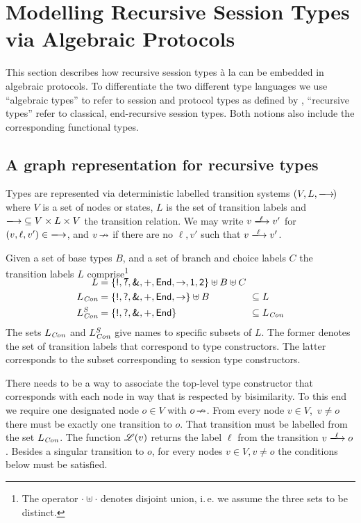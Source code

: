 \section{Modelling Recursive Session Types via Algebraic Protocols}

This section describes how recursive session types \`a la
\citet{DBLP:journals/jfp/GayV10} can be embedded in algebraic protocols. To
differentiate the two different type languages we use ``algebraic types'' to
refer to session and protocol types as defined by
\citet{DBLP:journals/pacmpl/MordidoS0V23}, ``recursive types'' refer to
classical, end-recursive session types. Both notions also include the
corresponding functional types.


\subsection{A graph representation for recursive types}

Types are represented via deterministic labelled transition systems $\stlts$
where $V$ is a set of nodes or states, $L$ is the set of transition labels and
${\sttrans{}} \subseteq V\times L\times V$ the transition relation. We may
write $v\sttrans\ell v'$ for $(v,\ell,v')\in{\sttrans{}}$, and $v\,{\nrightarrow}$ if
there are no $\ell,v'$ such that $v\sttrans\ell v'$.

Given a set of base types $B$, and a set of branch and choice labels $C$ the
transition labels $L$ comprise\footnote{The operator ${\cdot} \uplus {\cdot}$
denotes disjoint union, i.\,e. we assume the three sets to be distinct.}
%
\begin{align*}
  \SwapAboveDisplaySkip
  L &= \stltsLDefn \\
  \labset
    &= \mathrlap{\stltsLDefnCon} \hphantom{\stltsLDefn}
        \ \subseteq L
    \\
  \labsetS
    &= \mathrlap{\stltsLDefnS} \hphantom{\stltsLDefn}
        \ \subseteq \labset
\end{align*}
%
The sets $L_{\textit{Con}}$ and $L_{\textit{Con}}^S$ give names to specific subsets of $L$. The
former denotes the set of transition labels that correspond to type
constructors. The latter corresponds to the subset corresponding to session
type constructors.

There needs to be a way to associate the top-level type constructor that
corresponds with each node in way that is respected by bisimilarity. To this
end we require one designated node $o\in V$ with $o\,{\nrightarrow}$. From every node
$v\in V$\!,~$v \ne o$ there must be exactly one transition to $o$. That
transition must be labelled from the set $L_{\textit{Con}}$. The function $\mathscr{L}(v)$
returns the label $\ell$ from the transition $v \sttrans\ell o$. Besides a
singular transition to $o$, for every nodes $v\in V, v\ne o$ the conditions
below must be satisfied.


